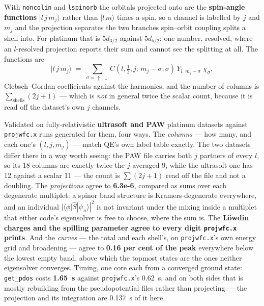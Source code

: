 \documentclass[11pt,a4paper]{article}
\newcommand{\code}[1]{\texttt{\small #1}}
\begin{document}
With \code{noncolin} and \code{lspinorb} the orbitals projected onto are the
\textbf{spin-angle functions} $|l\,j\,m_j\rangle$ rather than $|l\,m\rangle$
times a spin, so a channel is labelled by $j$ and $m_j$ and the projection
separates the two branches spin--orbit coupling splits a shell into. For
platinum that is $5d_{3/2}$ against $5d_{5/2}$: one number, resolved, where an
$l$-resolved projection reports their sum and cannot see the splitting at all.
The functions are
\begin{equation*}
  |l\,j\,m_j\rangle \;=\;
  \sum_{\sigma=\uparrow,\downarrow}
  C\!\left(l,\tfrac12,j;\,m_j-\sigma,\sigma\right)\,
  Y_{l,\,m_j-\sigma}\;\chi_\sigma ,
\end{equation*}
Clebsch--Gordan coefficients against the harmonics, and the number of columns is
$\sum_\mathrm{shells}(2j+1)$ --- which is \emph{not} in general twice the scalar
count, because it is read off the dataset's own $j$ channels.


Validated on fully-relativistic \textbf{ultrasoft and PAW} platinum datasets
against \code{projwfc.x} runs generated for them, four ways. The \emph{columns} --- how
many, and each one's $(l, j, m_j)$ --- match QE's own label table exactly. The
two datasets differ there in a way worth seeing: the PAW file carries both $j$
partners of every $l$, so its 18 columns are exactly twice the $j$-averaged 9,
while the ultrasoft one has 12 against a scalar 11 --- the count is
$\sum (2j + 1)$ read off the file and not a doubling. The \emph{projections}
agree to
\textbf{6.3e-6}, compared as sums over each degenerate multiplet: a spinor band
structure is Kramers-degenerate everywhere, and an individual
$|\langle\phi|\hat S|\psi_n\rangle|^2$ is not invariant under the mixing inside
a multiplet that either code's eigensolver is free to choose, where the sum is.
The \textbf{Löwdin charges and the spilling parameter agree to every digit
\code{projwfc.x} prints}. And the \emph{curves} --- the total and each shell's,
on \code{projwfc.x}'s own energy grid and broadening --- agree to \textbf{0.16
per cent of the peak} everywhere below the lowest empty band, above which the
topmost states are the ones neither eigensolver converges. Timing, one core each from a converged ground state:
\code{get\_pdos} costs \textbf{1.65~s} against \code{projwfc.x}'s 0.62~s, and
on both sides that is mostly rebuilding from the pseudopotential files rather
than projecting --- the projection and its integration are 0.137~s of it here.
\end{document}
